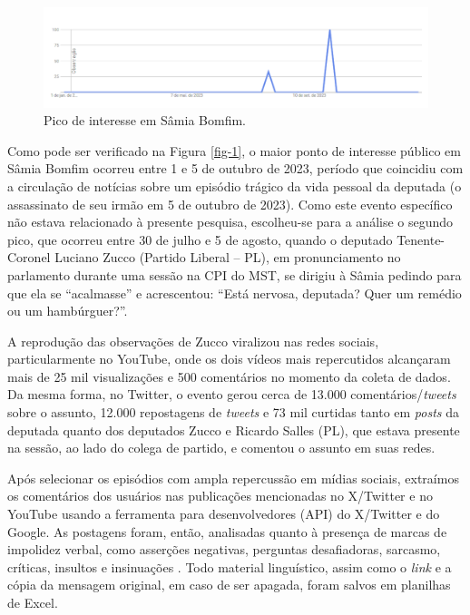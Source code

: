 \documentclass[portuguese]{textolivre}
\begin{document}
\begin{figure}[h!]
\centering
\begin{minipage}{.95\textwidth}
\includegraphics[width =\textwidth ]{Fig1.png}
\caption{Pico de interesse em Sâmia Bomfim.}
\label{graf-1}
\end{minipage}
\end{figure}

Como pode ser verificado na Figura \ref{fig-1}, o maior ponto de interesse público em Sâmia Bomfim ocorreu entre 1 e 5 de outubro de 2023, período que coincidiu com a circulação de notícias sobre um episódio trágico da vida pessoal da deputada (o assassinato de seu irmão em 5 de outubro de 2023). Como este evento específico não estava relacionado à presente pesquisa, escolheu-se para a análise o segundo pico, que ocorreu entre 30 de julho e 5 de agosto, quando o deputado Tenente-Coronel Luciano Zucco (Partido Liberal – PL), em pronunciamento no parlamento durante uma sessão na CPI do MST, se dirigiu à Sâmia pedindo para que ela se ``acalmasse'' e acrescentou: ``Está nervosa, deputada? Quer um remédio ou um hambúrguer?''.

A reprodução das observações de Zucco viralizou nas redes sociais, particularmente no YouTube, onde os dois vídeos mais repercutidos alcançaram mais de 25 mil visualizações e 500 comentários no momento da coleta de dados. Da mesma forma, no Twitter, o evento gerou cerca de 13.000 comentários/\textit{tweets} sobre o assunto, 12.000 repostagens de \textit{tweets} e 73 mil curtidas tanto em \textit{posts} da deputada quanto dos deputados Zucco e Ricardo Salles (PL), que estava presente na sessão, ao lado do colega de partido, e comentou o assunto em suas redes.

Após selecionar os episódios com ampla repercussão em mídias sociais, extraímos os comentários dos usuários nas publicações mencionadas no X/Twitter e no YouTube usando a ferramenta para desenvolvedores (API) do X/Twitter e do Google. As postagens foram, então, analisadas quanto à presença de marcas de impolidez verbal, como asserções negativas, perguntas desafiadoras, sarcasmo, críticas, insultos e insinuações \cite{culpeper2011}. Todo material linguístico, assim como o \textit{link} e a cópia da mensagem original, em caso de ser apagada, foram salvos em planilhas de Excel.
\end{document}
